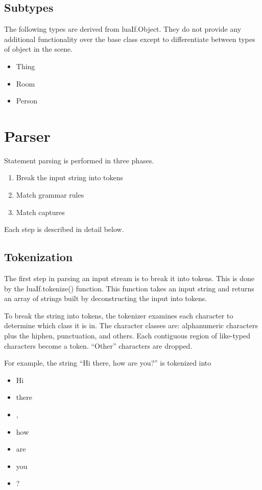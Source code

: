 \documentclass{book}
\begin{document}
\subsection{Subtypes}

The following types are derived from luaIf.Object. They do not provide
any additional functionality over the base class except to
differentiate between types of object in the scene.

\begin{itemize}
\item Thing
\item Room
\item Person
\end{itemize}

\section{Parser}

Statement parsing is performed in three phases.

\begin{enumerate}
\item Break the input string into tokens
\item Match grammar rules
\item Match captures
\end{enumerate}

Each step is described in detail below.

\subsection{Tokenization}

The first step in parsing an input stream is to break it into
tokens. This is done by the luaIf.tokenize() function. This function
takes an input string and returns an array of strings built by
deconstructing the input into tokens.

To break the string into tokens, the tokenizer examines each character
to determine which class it is in. The character classes are:
alphanumeric characters plus the hiphen, punctuation, and others. Each
contiguous region of like-typed characters become a token. ``Other''
characters are dropped.

For example, the string ``Hi there, how are you?'' is tokenized into
\begin{itemize}
\item Hi
\item there
\item ,
\item how
\item are
\item you
\item ?
\end{itemize}
\end{document}
